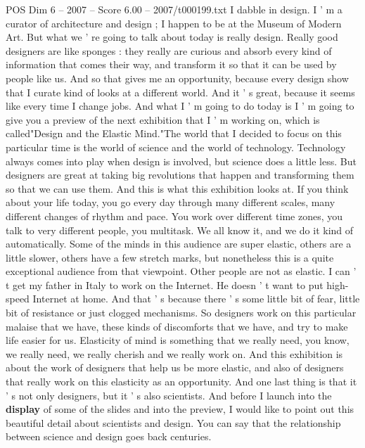 \begin{textsample}{POS Dim 6 – 2007 – Score 6.00 – 2007/t000199.txt}  \label{ex:f6_pos_017}
I dabble in design.
I ' m a curator of architecture and design ; I happen to be at the Museum of Modern Art.
But what we ' re going to talk about today is really design.
Really good designers are like sponges : they really are curious and absorb every kind of information that comes their way, and transform it so that it can be used by people like us.
And so that gives me an opportunity, because every design show that I curate kind of looks at a different world.
And it ' s great, because it seems like every time I change jobs.
And what I ' m going to do today is I ' m going to give you a preview of the next exhibition that I ' m working on, which is called"Design and the Elastic Mind."The world that I decided to focus on this particular time is the world of science and the world of technology.
Technology always comes into play when design is involved, but science does a little less.
But designers are great at taking big revolutions that happen and transforming them so that we can use them.
And this is what this exhibition looks at.
If you think about your life today, you go every day through many different scales, many different changes of rhythm and pace.
You work over different time zones, you talk to very different people, you multitask.
We all know it, and we do it kind of automatically.
Some of the minds in this audience are super elastic, others are a little slower, others have a few stretch marks, but nonetheless this is a quite exceptional audience from that viewpoint.
Other people are not as elastic.
I can ' t get my father in Italy to work on the Internet.
He doesn ' t want to put high-speed Internet at home.
And that ' s because there ' s some little bit of fear, little bit of resistance or just clogged mechanisms.
So designers work on this particular malaise that we have, these kinds of discomforts that we have, and try to make life easier for us.
Elasticity of mind is something that we really need, you know, we really need, we really cherish and we really work on.
And this exhibition is about the work of designers that help us be more elastic, and also of designers that really work on this elasticity as an opportunity.
And one last thing is that it ' s not only designers, but it ' s also scientists.
And before I launch into the \textbf{display} of some of the slides and into the preview, I would like to point out this beautiful detail about scientists and design.
You can say that the relationship between science and design goes back centuries.

\end{textsample}
